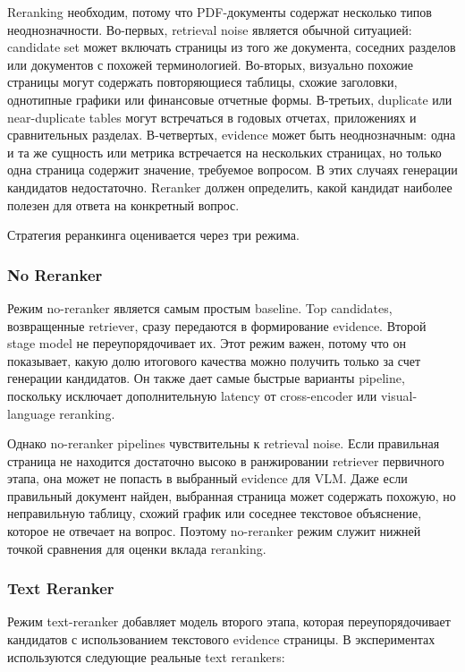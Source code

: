 \documentclass[conference]{IEEEtran}
\begin{document}
Reranking необходим, потому что PDF-документы содержат несколько типов неоднозначности. Во-первых, retrieval noise является обычной ситуацией: candidate set может включать страницы из того же документа, соседних разделов или документов с похожей терминологией. Во-вторых, визуально похожие страницы могут содержать повторяющиеся таблицы, схожие заголовки, однотипные графики или финансовые отчетные формы. В-третьих, duplicate или near-duplicate tables могут встречаться в годовых отчетах, приложениях и сравнительных разделах. В-четвертых, evidence может быть неоднозначным: одна и та же сущность или метрика встречается на нескольких страницах, но только одна страница содержит значение, требуемое вопросом. В этих случаях генерации кандидатов недостаточно. Reranker должен определить, какой кандидат наиболее полезен для ответа на конкретный вопрос.

Стратегия реранкинга оценивается через три режима.

\subsubsection{No Reranker}

Режим no-reranker является самым простым baseline. Top candidates, возвращенные retriever, сразу передаются в формирование evidence. Второй stage model не переупорядочивает их. Этот режим важен, потому что он показывает, какую долю итогового качества можно получить только за счет генерации кандидатов. Он также дает самые быстрые варианты pipeline, поскольку исключает дополнительную latency от cross-encoder или visual-language reranking.

Однако no-reranker pipelines чувствительны к retrieval noise. Если правильная страница не находится достаточно высоко в ранжировании retriever первичного этапа, она может не попасть в выбранный evidence для VLM. Даже если правильный документ найден, выбранная страница может содержать похожую, но неправильную таблицу, схожий график или соседнее текстовое объяснение, которое не отвечает на вопрос. Поэтому no-reranker режим служит нижней точкой сравнения для оценки вклада reranking.

\subsubsection{Text Reranker}

Режим text-reranker добавляет модель второго этапа, которая переупорядочивает кандидатов с использованием текстового evidence страницы. В экспериментах используются следующие реальные text rerankers:
\end{document}
